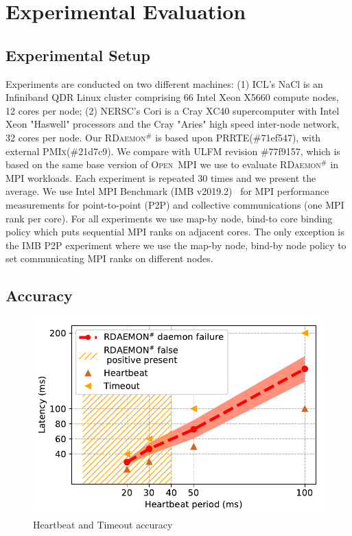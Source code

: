 \documentclass[sigconf]{acmart}
\newcommand{\prrte}[0]{\textsc{PRRTE}\xspace}
\newcommand{\pmix}[0]{\textsc{PMIx}\xspace}
\newcommand{\ompi}[0]{\textsc{Open~MPI}\xspace}
\newcommand{\ulfm}[0]{\textsc{ULFM}\xspace}
\newcommand{\mpi}[0]{\textsc{MPI}\xspace}
\newcommand{\ourwork}[0]{\textsc{RDaemon}\ensuremath{^\#}\xspace}
\newcommand{\imb}[0]{\textsc{IMB}\xspace}
\begin{document}
\section{Experimental Evaluation}\label{sec:experiments}

\subsection{Experimental Setup}
Experiments are conducted on two different machines: (1) ICL's NaCl is an Infiniband QDR Linux cluster comprising 66 Intel Xeon X5660 compute nodes, 12 cores per node; (2) NERSC's Cori
is a Cray XC40 supercomputer with Intel Xeon "Haswell" processors and the Cray "Aries" high speed inter-node network, 32 cores per node. Our \ourwork is based upon \prrte (\#71ef547), with external \pmix (\#21d7c9). We compare with \ulfm revision \#77f9157, which is based on the same base version of \ompi we use to evaluate \ourwork in MPI workloads. Each experiment is repeated 30 times and we present the average. We use Intel MPI Benchmark (\imb v2019.2)~\cite{IMB} for MPI performance measurements for point-to-point (P2P) and collective communications (one \mpi rank per core). For all experiments we use map-by node, bind-to core binding policy which puts sequential MPI ranks on adjacent cores. The only exception is the \imb P2P experiment where we use
the map-by node, bind-by node policy to set communicating \mpi ranks on different nodes.

\subsection{Accuracy}
\begin{figure}[h]
  \centering
  \includegraphics[width=\linewidth]{accuracy.pdf}
  \caption{Heartbeat and Timeout accuracy}
  \label{fig:accuracy}
\end{figure}
\end{document}
